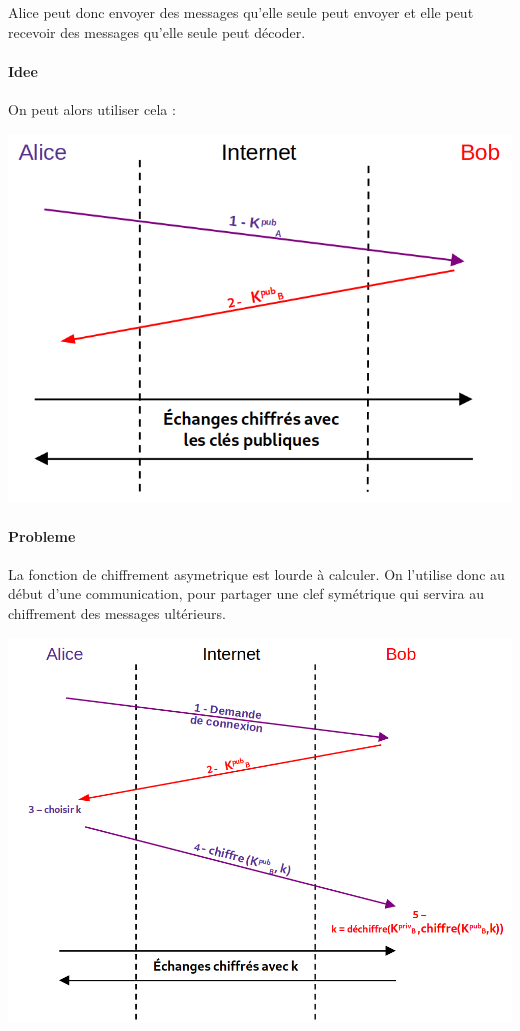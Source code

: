 Alice peut donc envoyer des messages qu'elle seule peut envoyer et elle peut recevoir des messages qu'elle seule peut décoder.

\paragraph{Idee} On peut alors utiliser cela :
\begin{center}
	\includegraphics[scale = 0.5]{Developpements/Protocole HTTPS/protocole1.png}
\end{center}


\paragraph{Probleme} La fonction de chiffrement asymetrique est lourde à calculer. On l'utilise donc au début d'une communication, pour partager une clef symétrique qui servira au chiffrement des messages ultérieurs.

\begin{center}
	\includegraphics[scale = 0.5]{Developpements/Protocole HTTPS/protocole2.png}
\end{center}




